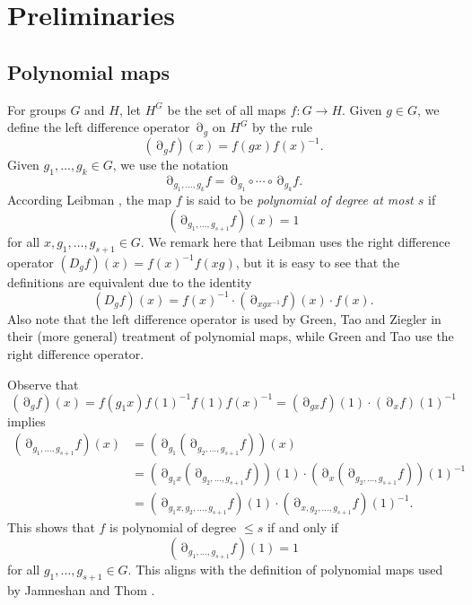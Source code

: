 \documentclass[a4paper,12pt]{amsart}
\theoremstyle{plain}
\theoremstyle{definition}
\theoremstyle{remark}
\numberwithin{equation}{subsection}
\DeclareMathOperator{\Pold}{Pol}
\DeclareMathOperator{\mypartial}{\partial}
\begin{document}


\section{Preliminaries}
\label{s:prelim}

\subsection{Polynomial maps}
\label{ss:poly_prelim}

For groups $G$ and $H$, let $H^G$ be the set of all maps
$f:G\to H$. Given $g\in G$, we define the left difference operator $\mypartial_g$ on $H^G$ by the rule
$$(\mypartial_g f)(x)=f(gx)f(x)^{-1}.$$
Given $g_1,\ldots ,g_k\in G$, we use the notation
$$\mypartial_{g_1,\ldots,g_k}f=\mypartial_{g_1}\circ\cdots\circ\mypartial_{g_k}f.$$
According Leibman \cite{Lei02}, the map $f$ is said to be \emph{polynomial of degree at most $s$} if
$$(\mypartial_{g_1,\ldots ,g_{s+1}}f)(x)=1$$
for all $x,g_1,\ldots ,g_{s+1}\in G$. We remark here that Leibman \cite{Lei02} uses the right difference operator $(D_gf)(x)=f(x)^{-1}f(xg)$, but it is easy to see that the definitions are equivalent due to the identity
$$(D_gf)(x)=f(x)^{-1}\cdot (\mypartial_{xgx^{-1}}f)(x)\cdot f(x).$$
Also note that the left difference operator is used by Green, Tao and Ziegler \cite{GTZ12} in their (more general) treatment of polynomial maps, while Green and Tao \cite{GT12} use the right difference operator.

Observe that
$$(\mypartial_gf)(x)
=f(g_1x)f(1)^{-1}f(1)f(x)^{-1}
=(\mypartial_{gx}f)(1)\cdot(\mypartial_xf)(1)^{-1}$$ implies
\begin{align*}
    (\mypartial_{g_1,\ldots ,g_{s+1}}f)(x) &=
    (\mypartial_{g_1}(\mypartial_{g_2,\ldots,g_{s+1}}f))(x)\\
    &= (\mypartial_{g_1x}(\mypartial_{g_2,\ldots,g_{s+1}}f))(1)
    \cdot (\mypartial_x(\mypartial_{g_2,\ldots,g_{s+1}}f))(1)^{-1}\\
    &= (\mypartial_{g_1x,g_2,\ldots,g_{s+1}}f)(1)
    \cdot (\mypartial_{x,g_2,\ldots,g_{s+1}}f)(1)^{-1}.
\end{align*}
This shows that $f$ is polynomial of degree $\le s$ if and only if 
$$(\mypartial_{g_1,\ldots ,g_{s+1}}f)(1)=1$$
for all $g_1,\ldots ,g_{s+1}\in G$. This aligns with the definition of polynomial maps used by Jamneshan and Thom \cite{JT24}. 
\end{document}
